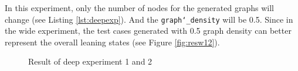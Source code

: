 In this experiment, only the number of nodes for the generated graphs will change (see Listing \ref{lst:deepexp}). 
And the \texttt{graph\char`_density} will be 0.5.
Since in the wide experiment, the test cases generated with 0.5 graph density can better represent the overall leaning states (see Figure \ref{fig:resw12}).

\begin{figure}[h]
    \centering
    \caption{Result of deep experiment 1 and 2}
    \label{fig:resd12}
\end{figure}

